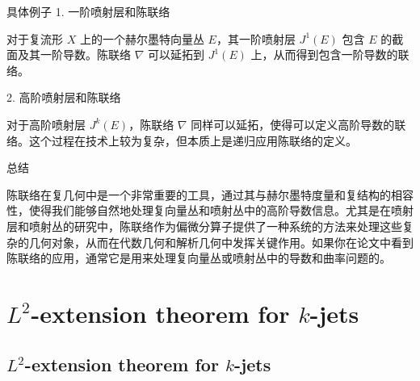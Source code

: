 \documentclass[lang=cn,12pt,a4paper,fontset=none]{beautybook}
\begin{document}
具体例子
1. 一阶喷射层和陈联络

对于复流形 $X$ 上的一个赫尔墨特向量丛 $E$，其一阶喷射层 $J^1(E)$ 包含 $E$ 的截面及其一阶导数。陈联络 $\nabla$ 可以延拓到 $J^1(E)$ 上，从而得到包含一阶导数的联络。

2. 高阶喷射层和陈联络

对于高阶喷射层 $J^k(E)$，陈联络 $\nabla$ 同样可以延拓，使得可以定义高阶导数的联络。这个过程在技术上较为复杂，但本质上是递归应用陈联络的定义。

总结

陈联络在复几何中是一个非常重要的工具，通过其与赫尔墨特度量和复结构的相容性，使得我们能够自然地处理复向量丛和喷射丛中的高阶导数信息。尤其是在喷射层和喷射丛的研究中，陈联络作为偏微分算子提供了一种系统的方法来处理这些复杂的几何对象，从而在代数几何和解析几何中发挥关键作用。如果你在论文中看到陈联络的应用，通常它是用来处理复向量丛或喷射丛中的导数和曲率问题的。

\part{\texorpdfstring{$L^2$}{}-extension theorem for \texorpdfstring{$k$}{}-jets }
\chapter{\texorpdfstring{$L^2$}{}-extension theorem for \texorpdfstring{$k$}{}-jets }
\end{document}
